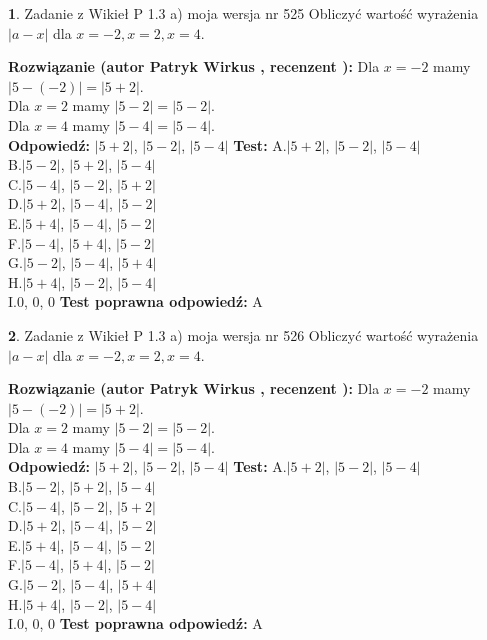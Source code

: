 \documentclass[12pt, a4paper]{article}
\theoremstyle{definition} %
\newtheorem{zad}{}
\newcommand{\zadStart}[1]{\begin{zad}#1\newline}
\newcommand{\zadStop}{\end{zad}}
\newcommand{\rozwStart}[2]{\noindent \textbf{Rozwiązanie (autor #1 , recenzent #2): }\newline}
\newcommand{\rozwStop}{\newline}
\newcommand{\odpStart}{\noindent \textbf{Odpowiedź:}\newline}
\newcommand{\odpStop}{\newline}
\newcommand{\testStart}{\noindent \textbf{Test:}\newline}
\newcommand{\testStop}{\newline}
\newcommand{\kluczStart}{\noindent \textbf{Test poprawna odpowiedź:}\newline}
\newcommand{\kluczStop}{\newline}
\begin{document}
\zadStart{Zadanie z Wikieł P 1.3 a) moja wersja nr 525}
Obliczyć wartość wyrażenia $|a - x|$ dla $x=-2,x=2,x=4$.
\zadStop
\rozwStart{Patryk Wirkus}{}
Dla $x = -2$ mamy $|5 - (-2)| = |5 + 2|$.\\
Dla $x = 2$ mamy $|5 - 2| = |5 - 2|$.\\
Dla $x = 4$ mamy $|5 - 4| = |5 - 4|$.\\
\rozwStop
\odpStart
$|5 + 2|$, $|5 - 2|$, $|5 - 4|$
\odpStop
\testStart
A.$|5 + 2|$, $|5 - 2|$, $|5 - 4|$\\
B.$|5 - 2|$, $|5 + 2|$, $|5 - 4|$\\
C.$|5 - 4|$, $|5 - 2|$, $|5 + 2|$\\
D.$|5 + 2|$, $|5 - 4|$, $|5 - 2|$\\
E.$|5 + 4|$, $|5 - 4|$, $|5 - 2|$\\
F.$|5 - 4|$, $|5 + 4|$, $|5 - 2|$\\
G.$|5 - 2|$, $|5 - 4|$, $|5 + 4|$\\
H.$|5 + 4|$, $|5 - 2|$, $|5 - 4|$\\
I.$0$, $0$, $0$
\testStop
\kluczStart
A
\kluczStop



\zadStart{Zadanie z Wikieł P 1.3 a) moja wersja nr 526}
Obliczyć wartość wyrażenia $|a - x|$ dla $x=-2,x=2,x=4$.
\zadStop
\rozwStart{Patryk Wirkus}{}
Dla $x = -2$ mamy $|5 - (-2)| = |5 + 2|$.\\
Dla $x = 2$ mamy $|5 - 2| = |5 - 2|$.\\
Dla $x = 4$ mamy $|5 - 4| = |5 - 4|$.\\
\rozwStop
\odpStart
$|5 + 2|$, $|5 - 2|$, $|5 - 4|$
\odpStop
\testStart
A.$|5 + 2|$, $|5 - 2|$, $|5 - 4|$\\
B.$|5 - 2|$, $|5 + 2|$, $|5 - 4|$\\
C.$|5 - 4|$, $|5 - 2|$, $|5 + 2|$\\
D.$|5 + 2|$, $|5 - 4|$, $|5 - 2|$\\
E.$|5 + 4|$, $|5 - 4|$, $|5 - 2|$\\
F.$|5 - 4|$, $|5 + 4|$, $|5 - 2|$\\
G.$|5 - 2|$, $|5 - 4|$, $|5 + 4|$\\
H.$|5 + 4|$, $|5 - 2|$, $|5 - 4|$\\
I.$0$, $0$, $0$
\testStop
\kluczStart
A
\kluczStop
\end{document}
